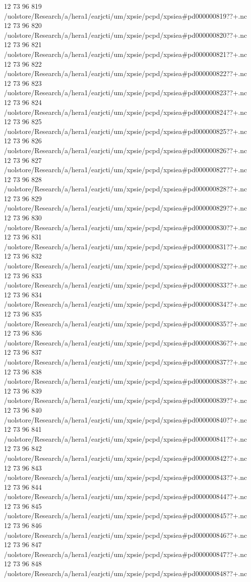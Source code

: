 12 73 96
819
/uolstore/Research/a/hera1/earjcti/um/xpsie/pcpd/xpsiea#pd000000819??+.nc
12 73 96
820
/uolstore/Research/a/hera1/earjcti/um/xpsie/pcpd/xpsiea#pd000000820??+.nc
12 73 96
821
/uolstore/Research/a/hera1/earjcti/um/xpsie/pcpd/xpsiea#pd000000821??+.nc
12 73 96
822
/uolstore/Research/a/hera1/earjcti/um/xpsie/pcpd/xpsiea#pd000000822??+.nc
12 73 96
823
/uolstore/Research/a/hera1/earjcti/um/xpsie/pcpd/xpsiea#pd000000823??+.nc
12 73 96
824
/uolstore/Research/a/hera1/earjcti/um/xpsie/pcpd/xpsiea#pd000000824??+.nc
12 73 96
825
/uolstore/Research/a/hera1/earjcti/um/xpsie/pcpd/xpsiea#pd000000825??+.nc
12 73 96
826
/uolstore/Research/a/hera1/earjcti/um/xpsie/pcpd/xpsiea#pd000000826??+.nc
12 73 96
827
/uolstore/Research/a/hera1/earjcti/um/xpsie/pcpd/xpsiea#pd000000827??+.nc
12 73 96
828
/uolstore/Research/a/hera1/earjcti/um/xpsie/pcpd/xpsiea#pd000000828??+.nc
12 73 96
829
/uolstore/Research/a/hera1/earjcti/um/xpsie/pcpd/xpsiea#pd000000829??+.nc
12 73 96
830
/uolstore/Research/a/hera1/earjcti/um/xpsie/pcpd/xpsiea#pd000000830??+.nc
12 73 96
831
/uolstore/Research/a/hera1/earjcti/um/xpsie/pcpd/xpsiea#pd000000831??+.nc
12 73 96
832
/uolstore/Research/a/hera1/earjcti/um/xpsie/pcpd/xpsiea#pd000000832??+.nc
12 73 96
833
/uolstore/Research/a/hera1/earjcti/um/xpsie/pcpd/xpsiea#pd000000833??+.nc
12 73 96
834
/uolstore/Research/a/hera1/earjcti/um/xpsie/pcpd/xpsiea#pd000000834??+.nc
12 73 96
835
/uolstore/Research/a/hera1/earjcti/um/xpsie/pcpd/xpsiea#pd000000835??+.nc
12 73 96
836
/uolstore/Research/a/hera1/earjcti/um/xpsie/pcpd/xpsiea#pd000000836??+.nc
12 73 96
837
/uolstore/Research/a/hera1/earjcti/um/xpsie/pcpd/xpsiea#pd000000837??+.nc
12 73 96
838
/uolstore/Research/a/hera1/earjcti/um/xpsie/pcpd/xpsiea#pd000000838??+.nc
12 73 96
839
/uolstore/Research/a/hera1/earjcti/um/xpsie/pcpd/xpsiea#pd000000839??+.nc
12 73 96
840
/uolstore/Research/a/hera1/earjcti/um/xpsie/pcpd/xpsiea#pd000000840??+.nc
12 73 96
841
/uolstore/Research/a/hera1/earjcti/um/xpsie/pcpd/xpsiea#pd000000841??+.nc
12 73 96
842
/uolstore/Research/a/hera1/earjcti/um/xpsie/pcpd/xpsiea#pd000000842??+.nc
12 73 96
843
/uolstore/Research/a/hera1/earjcti/um/xpsie/pcpd/xpsiea#pd000000843??+.nc
12 73 96
844
/uolstore/Research/a/hera1/earjcti/um/xpsie/pcpd/xpsiea#pd000000844??+.nc
12 73 96
845
/uolstore/Research/a/hera1/earjcti/um/xpsie/pcpd/xpsiea#pd000000845??+.nc
12 73 96
846
/uolstore/Research/a/hera1/earjcti/um/xpsie/pcpd/xpsiea#pd000000846??+.nc
12 73 96
847
/uolstore/Research/a/hera1/earjcti/um/xpsie/pcpd/xpsiea#pd000000847??+.nc
12 73 96
848
/uolstore/Research/a/hera1/earjcti/um/xpsie/pcpd/xpsiea#pd000000848??+.nc
